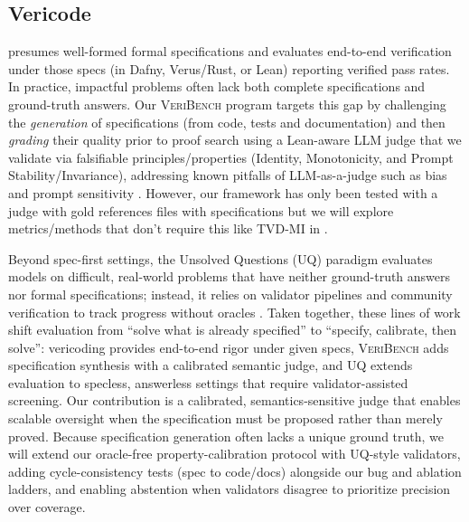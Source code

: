 \documentclass{article}
\begin{document}
\subsection{Vericode}
\citet{bursuc2025benchmarkvericodingformallyverified} presumes well-formed formal specifications and evaluates end-to-end verification under those specs (in Dafny, Verus/Rust, or Lean) reporting verified pass rates.
In practice, impactful problems often lack both complete specifications and ground-truth answers.
Our \textsc{VeriBench} program targets this gap by challenging the \emph{generation} of specifications (from code, tests and documentation) and then \emph{grading} their quality prior to proof search using a Lean-aware LLM judge that we validate via falsifiable principles/properties (Identity, Monotonicity, and Prompt Stability/Invariance), addressing known pitfalls of LLM-as-a-judge such as bias and prompt sensitivity \citep{Zheng2023MTBench,Kocmi2024HumanVsLLM,Li2024TrustLLMJudgments}.
However, our framework has only been tested with a judge with gold references files with specifications but we will explore metrics/methods that don't require this like TVD-MI in \citep{robertson2025stepbystep}.

Beyond spec-first settings, the Unsolved Questions (UQ) paradigm evaluates models on difficult, real-world problems that have neither ground-truth answers nor formal specifications; instead, it relies on validator pipelines and community verification to track progress without oracles \cite{nie2025uqassessinglanguagemodels,uq2025}.
Taken together, these lines of work shift evaluation from “solve what is already specified” to “specify, calibrate, then solve”:
vericoding provides end-to-end rigor under given specs, \textsc{VeriBench} adds specification synthesis with a calibrated semantic judge, and UQ extends evaluation to specless, answerless settings that require validator-assisted screening.
Our contribution is a calibrated, semantics-sensitive judge that enables scalable oversight when the specification must be proposed rather than merely proved.
Because specification generation often lacks a unique ground truth, we will extend our oracle-free property-calibration protocol with UQ-style validators, adding cycle-consistency tests (spec to code/docs) alongside our bug and ablation ladders, and enabling abstention when validators disagree to prioritize precision over coverage.
\end{document}

